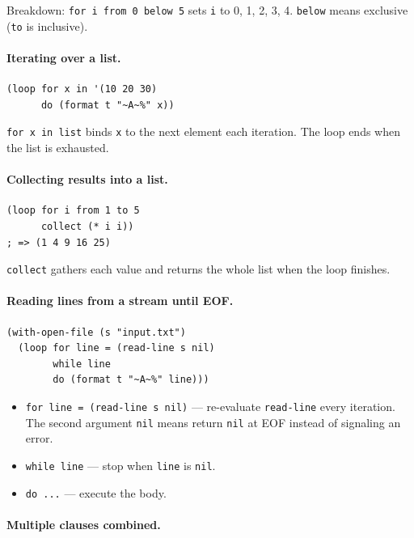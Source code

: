 Breakdown: \texttt{for i from 0 below 5} sets \texttt{i} to 0, 1, 2,
3, 4. \texttt{below} means exclusive (\texttt{to} is inclusive).

\paragraph{Iterating over a list.}

\begin{lstlisting}
(loop for x in '(10 20 30)
      do (format t "~A~%" x))
\end{lstlisting}

\texttt{for x in list} binds \texttt{x} to the next element each
iteration. The loop ends when the list is exhausted.

\paragraph{Collecting results into a list.}

\begin{lstlisting}
(loop for i from 1 to 5
      collect (* i i))
; => (1 4 9 16 25)
\end{lstlisting}

\texttt{collect} gathers each value and returns the whole list when the
loop finishes.

\paragraph{Reading lines from a stream until EOF.}

\begin{lstlisting}
(with-open-file (s "input.txt")
  (loop for line = (read-line s nil)
        while line
        do (format t "~A~%" line)))
\end{lstlisting}

\begin{itemize}
  \item \texttt{for line = (read-line s nil)} --- re-evaluate
        \texttt{read-line} every iteration.
        The second argument \texttt{nil} means return \texttt{nil}
        at EOF instead of signaling an error.
  \item \texttt{while line} --- stop when \texttt{line} is \texttt{nil}.
  \item \texttt{do ...} --- execute the body.
\end{itemize}

\paragraph{Multiple clauses combined.}

